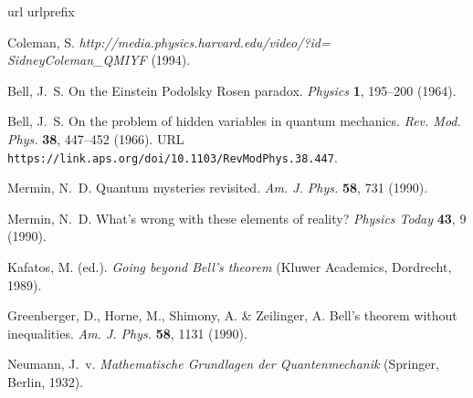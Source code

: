 \documentclass[twocolumn,prb]{revtex4}
\begin{document}
\begin{thebibliography}{10}
\expandafter\ifx\csname url\endcsname\relax
  \def\url#1{\texttt{#1}}\fi
\expandafter\ifx\csname urlprefix\endcsname\relax\def\urlprefix{URL }\fi
\providecommand{\bibinfo}[2]{#2}
\providecommand{\eprint}[2][]{\url{#2}}

\bibinfo{author}{Coleman, S.}
\newblock \emph{\bibinfo{journal}{http://media.physics.harvard.edu/video/?id=
  SidneyColeman\_QMIYF}}  (\bibinfo{year}{1994}).

\bibinfo{author}{Bell, J.~S.}
\newblock \bibinfo{title}{On the Einstein Podolsky Rosen paradox}.
\newblock \emph{\bibinfo{journal}{Physics}} \textbf{\bibinfo{volume}{1}},
  \bibinfo{pages}{195--200} (\bibinfo{year}{1964}).

\bibinfo{author}{Bell, J.~S.}
\newblock \bibinfo{title}{On the problem of hidden variables in quantum
  mechanics}.
\newblock \emph{\bibinfo{journal}{Rev. Mod. Phys.}}
  \textbf{\bibinfo{volume}{38}}, \bibinfo{pages}{447--452}
  (\bibinfo{year}{1966}).
\newblock \urlprefix\url{https://link.aps.org/doi/10.1103/RevModPhys.38.447}.

\bibinfo{author}{Mermin, N.~D.}
\newblock \bibinfo{title}{Quantum mysteries revisited}.
\newblock \emph{\bibinfo{journal}{Am. J. Phys.}} \textbf{\bibinfo{volume}{58}},
  \bibinfo{pages}{731} (\bibinfo{year}{1990}).

\bibinfo{author}{Mermin, N.~D.}
\newblock \bibinfo{title}{What's wrong with these elements of reality?}
\newblock \emph{\bibinfo{journal}{Physics Today}}
  \textbf{\bibinfo{volume}{43}}, \bibinfo{pages}{9} (\bibinfo{year}{1990}).

\bibinfo{editor}{Kafatos, M.} (ed.).
\newblock \emph{\bibinfo{title}{Going beyond Bell’s theorem}}
  (\bibinfo{publisher}{Kluwer Academics}, \bibinfo{address}{Dordrecht},
  \bibinfo{year}{1989}).

\bibinfo{author}{Greenberger, D.}, \bibinfo{author}{Horne, M.},
  \bibinfo{author}{Shimony, A.} \& \bibinfo{author}{Zeilinger, A.}
\newblock \bibinfo{title}{Bell’s theorem without inequalities}.
\newblock \emph{\bibinfo{journal}{Am. J. Phys.}} \textbf{\bibinfo{volume}{58}},
  \bibinfo{pages}{1131} (\bibinfo{year}{1990}).

\bibinfo{author}{Neumann, J.~v.}
\newblock \emph{\bibinfo{title}{{M}athematische {G}rundlagen der
  {Q}uantenmechanik}} (\bibinfo{publisher}{Springer},
  \bibinfo{address}{Berlin}, \bibinfo{year}{1932}).


\end{thebibliography}
\end{document}
